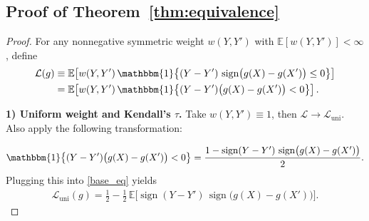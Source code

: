 \documentclass[11pt]{article}
\theoremstyle{plain}
\theoremstyle{plain}
\theoremstyle{plain}
\theoremstyle{plain}
\theoremstyle{plain}
\theoremstyle{plain}
\theoremstyle{plain}
\begin{document}
\subsection{Proof of Theorem~\ref{thm:equivalence}} \label{proof:equivalence_of_losses}
\begin{proof}
For any nonnegative symmetric weight $w(Y,Y')$ with $\mathbb{E}[w(Y,Y')]<\infty$, define
\begin{align}
\mathcal{L}(g) &\equiv\mathbb{E}\!\left[w(Y,Y')\,\mathbbm{1}\!\left\{(Y-Y')\,\operatorname{sign}\!\big(g(X)-g(X')\big)\le 0\right\}\right] \nonumber \\
    &= \mathbb{E}\!\left[w(Y,Y')\,\mathbbm{1}\!\left\{(Y-Y')\big(g(X)-g(X')\big)<0\right\}\right].
\label{base_eq}
\end{align}

\medskip
\noindent\textbf{1) Uniform weight and Kendall's $\tau$.}
Take $w(Y,Y')\equiv 1$, then $\mathcal{L}\xrightarrow{}\mathcal{L}_{\mathrm{uni}}$. Also apply the following transformation:

\begin{equation}
\label{eq: trick}
    \mathbbm{1}\!\left\{(Y-Y')\big(g(X)-g(X')\big)<0\right\}
=
\frac{1-\operatorname{sign}(Y-Y')\,\operatorname{sign}\!\big(g(X)-g(X')\big)}{2} .
\end{equation}
Plugging this into \eqref{base_eq} yields
\begin{align*}
\mathcal{L}_{\mathrm{uni}}(g)
=
\frac12
-\frac12\,\mathbb{E}\!\Big[\operatorname{sign}(Y-Y')\,\operatorname{sign}\!\big(g(X)-g(X')\big)\Big].
\end{align*}
\smallskip


\end{proof}
\end{document}
